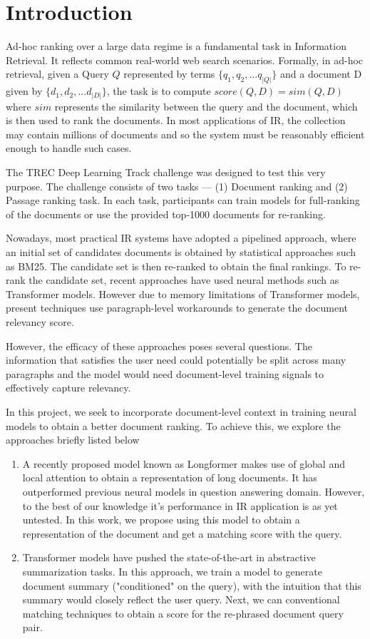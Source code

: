 \documentclass[sigconf, nonacm=true]{acmart}
\begin{document}
\section{Introduction}

Ad-hoc ranking over a large data regime is a fundamental task in Information Retrieval. It reflects common real-world web search scenarios. Formally, in ad-hoc retrieval, given a Query $Q$ represented by terms $\{ q_1, q_2, ... q_{|Q|} \}$ and a document D given by $\{ d_1, d_2, ... d_{|D|} \}$, the task is to compute $score(Q, D) = sim(Q, D)$ where $sim$ represents the similarity between the query and the document, which is then used to rank the documents. In most applications of IR, the collection may contain millions of documents and so the system must be reasonably efficient enough to handle such cases.

The TREC Deep Learning Track challenge was designed to test this very purpose. The challenge consists of two tasks --- (1) Document ranking and (2) Passage ranking task. In each task, participants can train models for full-ranking of the documents or use the provided top-1000  documents for re-ranking.

Nowadays, most practical IR systems have adopted a pipelined approach, where an initial set of candidates documents is obtained by statistical approaches such as BM25. The candidate set is then re-ranked to obtain the final rankings. To re-rank the candidate set, recent approaches have used neural methods such as Transformer models. However due to memory limitations of Transformer models, present techniques use paragraph-level workarounds to generate the document relevancy score.

However, the efficacy of these approaches poses several questions. The information that satisfies the user need could potentially be split across many paragraphs and the model would need document-level training signals to effectively capture relevancy.

In this project, we seek to incorporate document-level context in training neural models to obtain a better document ranking. To achieve this, we explore the approaches briefly listed below

\begin{enumerate}
  \item A recently proposed model known as Longformer \cite{Beltagy2020LongformerTL} makes use of global and local attention to obtain a representation of long documents. It has outperformed previous neural models in question answering domain. However, to the best of our knowledge it's performance in IR application is as yet untested. In this work, we propose using this model to obtain a representation of the document and get a matching score with the query.
  \item Transformer models have pushed the state-of-the-art in abstractive summarization tasks. In this approach, we train a model to generate document summary ("conditioned" on the query), with the intuition that this summary would closely reflect the user query. Next, we can conventional matching techniques to obtain a score for the re-phrased document query pair.
\end{enumerate}
\end{document}
